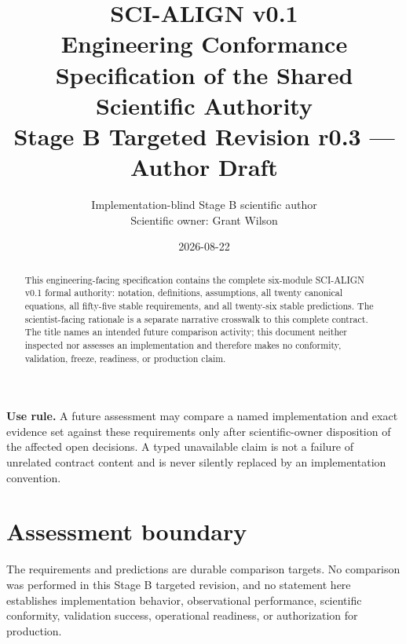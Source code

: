 \documentclass[10pt]{article}
\title{SCI-ALIGN v0.1\\
\large Engineering Conformance Specification of the Shared Scientific Authority\\
\normalsize Stage B Targeted Revision r0.3 --- Author Draft}
\author{Implementation-blind Stage B scientific author\\
Scientific owner: Grant Wilson}
\date{2026-08-22}
\begin{document}
\maketitle

\begin{abstract}
This engineering-facing specification contains the complete six-module
SCI-ALIGN v0.1 formal authority: notation, definitions, assumptions, all
twenty canonical equations, all fifty-five stable requirements, and all
twenty-six stable predictions.  The scientist-facing rationale is a separate
narrative crosswalk to this complete contract.  The title names an intended
future comparison activity; this document neither inspected nor assesses an
implementation and therefore makes no conformity, validation, freeze,
readiness, or production claim.
\end{abstract}

\noindent\textbf{Use rule.} A future assessment may compare a named
implementation and exact evidence set against these requirements only after
scientific-owner disposition of the affected open decisions.  A typed
unavailable claim is not a failure of unrelated contract content and is never
silently replaced by an implementation convention.

\tableofcontents








\section*{Assessment boundary}
The requirements and predictions are durable comparison targets.  No
comparison was performed in this Stage B targeted revision, and no statement here establishes
implementation behavior, observational performance, scientific conformity,
validation success, operational readiness, or authorization for production.
\end{document}
